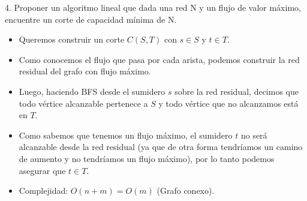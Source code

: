 \documentclass{article}
\begin{document}
4. Proponer un algoritmo lineal que dada una red N y un flujo de valor máximo, encuentre un corte
de capacidad mínima de N.
\begin{itemize}
    \item Queremos construir un corte \( C(S,T) \) con \( s \in S \) y \( t \in T \).
    \item Como conocemos el flujo que pasa por cada arista, podemos construir la red residual del grafo con flujo máximo.
    \item Luego, haciendo BFS desde el sumidero \( s \) sobre la red residual, decimos que todo vértice alcanzable pertenece a \( S \) y todo vértice que no alcanzamos está en \( T \).
    \item Como sabemos que tenemos un flujo máximo, el sumidero \( t \) no será alcanzable desde la red residual (ya que de otra forma tendríamos un camino de aumento y no tendríamos un flujo máximo), por lo tanto podemos asegurar que \( t \in T \).
    \item Complejidad: \( O(n + m) = O(m) \) (Grafo conexo).
    
\end{itemize}
\end{document}
